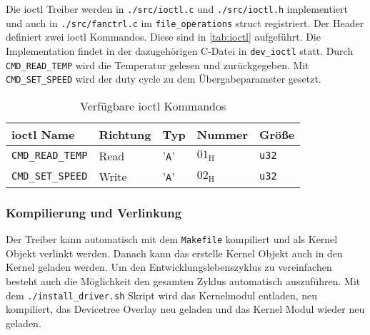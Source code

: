 Die \gls{ioctl} Treiber werden in \texttt{./src/ioctl.c} und \texttt{./src/ioctl.h} implementiert und auch in \texttt{./src/fanctrl.c} im \texttt{file\_operations} struct registriert.
Der Header definiert zwei \gls{ioctl} Kommandos.
Diese sind in \autoref{tab:ioctl} aufgeführt.
Die Implementation findet in der dazugehörigen C-Datei in \texttt{dev\_ioctl} statt.
Durch \texttt{CMD\_READ\_TEMP} wird die Temperatur gelesen und zurückgegeben.
Mit \texttt{CMD\_SET\_SPEED} wird der duty cycle zu dem Übergabeparameter gesetzt.

\begin{table}[h]
    \centering
    \begin{tabular}{|l|l|l|l|l|}
        \hline
        \textbf{\gls{ioctl} Name} & \textbf{Richtung} & \textbf{Typ} & \textbf{Nummer} & \textbf{Größe} \\
        \hline
        \hline
        \texttt{CMD\_READ\_TEMP} & Read & '\texttt{A}' & $01_{\text{H}}$ & \texttt{u32} \\
        \hline
        \texttt{CMD\_SET\_SPEED} & Write & '\texttt{A}' & $02_{\text{H}}$ & \texttt{u32} \\
        \hline
    \end{tabular}
    \caption{Verfügbare \acrshort{ioctl} Kommandos}
    \label{tab:ioctl}
\end{table}

\subsubsection{Kompilierung und Verlinkung}

Der Treiber kann automatisch mit dem \texttt{Makefile} kompiliert und als Kernel Objekt verlinkt werden.
Danach kann das erstelle Kernel Objekt auch in den Kernel geladen werden.
Um den Entwicklungslebenszyklus zu vereinfachen besteht auch die Möglichkeit den gesamten Zyklus automatisch auszuführen.
Mit dem \texttt{./install\_driver.sh} Skript wird das Kernelmodul entladen, neu kompiliert, das Devicetree Overlay neu geladen und das Kernel Modul wieder neu geladen.
